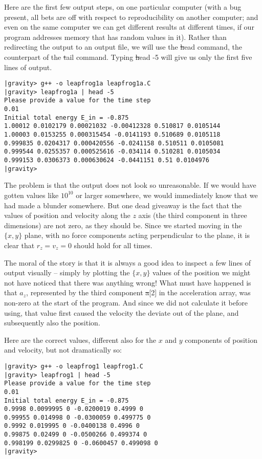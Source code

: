 Here are the first few output steps, on one particular computer
(with a bug present, all bets are off with respect to reproducibility
on another computer; and even on the same computer we can get
different results at different times, if our program addresses memory
that has random values in it).  Rather than redirecting the output to
an output file, we will use the {\st head} command, the counterpart of
the {\st tail} command.  Typing {\st head -5} will give us only the
first five lines of output.

\begin{small}
\begin{verbatim}
|gravity> g++ -o leapfrog1a leapfrog1a.C
|gravity> leapfrog1a | head -5
Please provide a value for the time step
0.01
Initial total energy E_in = -0.875
1.00012 0.0102179 0.00021032 -0.00412328 0.510817 0.0105144
1.00003 0.0153255 0.000315454 -0.0141193 0.510689 0.0105118
0.999835 0.0204317 0.000420556 -0.0241158 0.510511 0.0105081
0.999544 0.0255357 0.000525616 -0.034114 0.510281 0.0105034
0.999153 0.0306373 0.000630624 -0.0441151 0.51 0.0104976
|gravity>
\end{verbatim}
\end{small}

The problem is that the output does not look so unreasonable.
If we would have gotten values like $10^{10}$ or larger somewhere, we
would immediately know that we had made a blunder somewhere.  But one
dead giveaway is the fact that the values of position and velocity
along the $z$ axis (the third component in three dimensions) are not
zero, as they should be.  Since we started moving in the $\{x, y\}$
plane, with no force components acting perpendicular to the plane, it
is clear that $r_z = v_z = 0$ should hold for all times.  

The moral of the story is that it is always a good idea to inspect a
few lines of output visually -- simply by plotting the $\{x, y\}$
values of the position we might not have noticed that there was
anything wrong!  What must have happened is that $a_z$, represented by
the third component {\st a[2]} in the acceleration array, was non-zero
at the start of the program.  And since we did not calculate it before
using, that value first caused the velocity the deviate out of the
plane, and subsequently also the position.

Here are the correct values, different also for the $x$ and $y$
components of position and velocity, but not dramatically so:

\begin{small}
\begin{verbatim}
|gravity> g++ -o leapfrog1 leapfrog1.C
|gravity> leapfrog1 | head -5
Please provide a value for the time step
0.01
Initial total energy E_in = -0.875
0.9998 0.0099995 0 -0.0200019 0.4999 0
0.99955 0.014998 0 -0.0300059 0.499775 0
0.9992 0.019995 0 -0.0400138 0.4996 0
0.99875 0.02499 0 -0.0500266 0.499374 0
0.998199 0.0299825 0 -0.0600457 0.499098 0
|gravity>
\end{verbatim}
\end{small}

